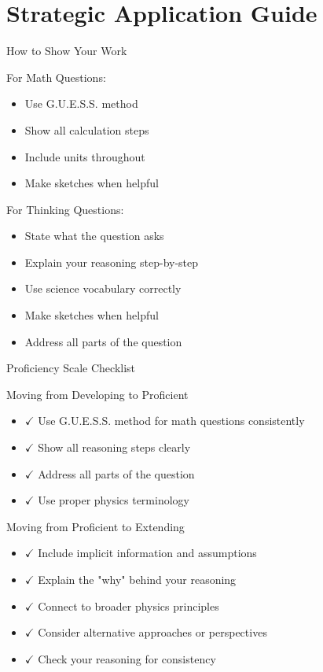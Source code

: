 \documentclass{beamer}
\begin{document}
\section{Strategic Application Guide}

\begin{frame}{How to Show Your Work}
\begin{block}{For Math Questions:}
\begin{itemize}
\item Use G.U.E.S.S. method \pause
\item Show all calculation steps \pause
\item Include units throughout \pause
\item Make sketches when helpful
\end{itemize}
\end{block}

\pause
\begin{block}{For Thinking Questions:}
\begin{itemize}
\item State what the question asks \pause
\item Explain your reasoning step-by-step \pause
\item Use science vocabulary correctly \pause
\item Make sketches when helpful \pause
\item Address all parts of the question
\end{itemize}
\end{block}
\end{frame}

\begin{frame}{Proficiency Scale Checklist}
\begin{block}{Moving from Developing to Proficient}
\begin{itemize}
\item $\checkmark$ Use G.U.E.S.S. method for math questions consistently \pause
\item $\checkmark$ Show all reasoning steps clearly \pause
\item $\checkmark$ Address all parts of the question \pause
\item $\checkmark$ Use proper physics terminology
\end{itemize}
\end{block}

\pause
\begin{block}{Moving from Proficient to Extending}
\begin{itemize}
\item $\checkmark$ Include implicit information and assumptions \pause
\item $\checkmark$ Explain the "why" behind your reasoning \pause
\item $\checkmark$ Connect to broader physics principles \pause
\item $\checkmark$ Consider alternative approaches or perspectives \pause
\item $\checkmark$ Check your reasoning for consistency
\end{itemize}
\end{block}
\end{frame}
\end{document}
